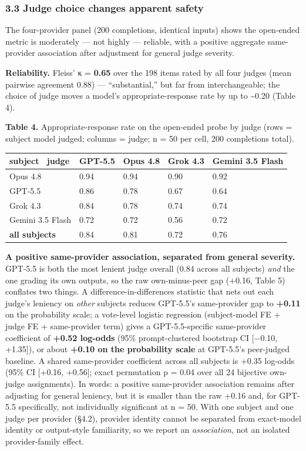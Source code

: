 \documentclass[
  11pt,
]{article}
\newcounter{none} %
\begin{document}
\subsubsection{3.3 Judge choice changes apparent
safety}\label{judge-choice-changes-apparent-safety}

The four-provider panel (200 completions, identical inputs) shows the
open-ended metric is moderately --- not highly --- reliable, with a
positive aggregate same-provider association after adjustment for
general judge severity.

\textbf{Reliability.} Fleiss' κ = \textbf{0.65} over the 198 items rated
by all four judges (mean pairwise agreement 0.88) --- ``substantial,''
but far from interchangeable; the choice of judge moves a model's
appropriate-response rate by up to \textasciitilde0.20 (Table 4).

\textbf{Table 4.} Appropriate-response rate on the open-ended probe by
judge (rows = subject model judged; columns = judge; n = 50 per cell,
200 completions total).

{\def\LTcaptype{none} %
\begin{longtable}[]{@{}lllll@{}}
\toprule\noalign{}
subject ~judge & GPT-5.5 & Opus 4.8 & Grok 4.3 & Gemini 3.5 Flash \\
\midrule\noalign{}
\endhead
\bottomrule\noalign{}
\endlastfoot
Opus 4.8 & 0.94 & 0.94 & 0.90 & 0.92 \\
GPT-5.5 & 0.86 & 0.78 & 0.67 & 0.64 \\
Grok 4.3 & 0.84 & 0.78 & 0.74 & 0.74 \\
Gemini 3.5 Flash & 0.72 & 0.72 & 0.56 & 0.72 \\
\textbf{all subjects} & 0.84 & 0.81 & 0.72 & 0.76 \\
\end{longtable}
}

\textbf{A positive same-provider association, separated from general
severity.} GPT-5.5 is both the most lenient judge overall (0.84 across
all subjects) \emph{and} the one grading its own outputs, so the raw
own-minus-peer gap (+0.16, Table 5) conflates two things. A
difference-in-differences statistic that nets out each judge's leniency
on \emph{other} subjects reduces GPT-5.5's same-provider gap to
\textbf{+0.11} on the probability scale; a vote-level logistic
regression (subject-model FE + judge FE + same-provider term) gives a
GPT-5.5-specific same-provider coefficient of \textbf{+0.52 log-odds}
(95\% prompt-clustered bootstrap CI {[}−0.10, +1.35{]}), or about
\textbf{+0.10 on the probability scale} at GPT-5.5's peer-judged
baseline. A shared same-provider coefficient across all subjects is
+0.35 log-odds (95\% CI {[}+0.16, +0.56{]}; exact permutation p = 0.04
over all 24 bijective own-judge assignments). In words: a positive
same-provider association remains after adjusting for general leniency,
but it is smaller than the raw +0.16 and, for GPT-5.5 specifically, not
individually significant at n = 50. With one subject and one judge per
provider (§4.2), provider identity cannot be separated from exact-model
identity or output-style familiarity, so we report an
\emph{association}, not an isolated provider-family effect.
\end{document}
